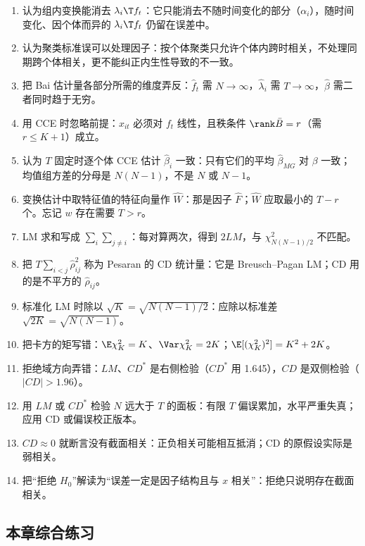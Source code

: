 \begin{enumerate}
  \item 认为组内变换能消去 $\lambda_i\T f_t$：它只能消去不随时间变化的部分（$\alpha_i$），随时间变化、因个体而异的 $\lambda_i\T f_t$ 仍留在误差中。
  \item 认为聚类标准误可以处理因子：按个体聚类只允许个体内跨时相关，不处理同期跨个体相关，更不能纠正内生性导致的不一致。
  \item 把 Bai 估计量各部分所需的维度弄反：$\hat f_t$ 需 $N\to\infty$，$\hat\lambda_i$ 需 $T\to\infty$，$\hat\beta$ 需二者同时趋于无穷。
  \item 用 CCE 时忽略前提：$x_{it}$ 必须对 $f_t$ 线性，且秩条件 $\rank\bar B=r$（需 $r\le K+1$）成立。
  \item 认为 $T$ 固定时逐个体 CCE 估计 $\hat\beta_i$ 一致：只有它们的平均 $\hat\beta_{MG}$ 对 $\beta$ 一致；均值组方差的分母是 $N(N-1)$，不是 $N$ 或 $N-1$。
  \item 变换估计中取特征值的特征向量作 $\hat W$：那是因子 $\hat F$；$\hat W$ 应取最小的 $T-r$ 个。忘记 $w$ 存在需要 $T>r$。
  \item LM 求和写成 $\sum_i\sum_{j\neq i}$：每对算两次，得到 $2LM$，与 $\chi^2_{N(N-1)/2}$ 不匹配。
  \item 把 $T\sum_{i<j}\hat\rho_{ij}^2$ 称为 Pesaran 的 CD 统计量：它是 Breusch--Pagan LM；CD 用的是不平方的 $\hat\rho_{ij}$。
  \item 标准化 LM 时除以 $\sqrt K=\sqrt{N(N-1)/2}$：应除以标准差 $\sqrt{2K}=\sqrt{N(N-1)}$。
  \item 把卡方的矩写错：$\E\chi^2_K=K$、$\Var\chi^2_K=2K$；$\E[(\chi^2_K)^2]=K^2+2K$。
  \item 拒绝域方向弄错：$LM$、$CD^*$ 是右侧检验（$CD^*$ 用 1.645），$CD$ 是双侧检验（$|CD|>1.96$）。
  \item 用 $LM$ 或 $CD^*$ 检验 $N$ 远大于 $T$ 的面板：有限 $T$ 偏误累加，水平严重失真；应用 CD 或偏误校正版本。
  \item $CD\approx0$ 就断言没有截面相关：正负相关可能相互抵消；CD 的原假设实际是弱相关。
  \item 把“拒绝 $H_0$”解读为“误差一定是因子结构且与 $x$ 相关”：拒绝只说明存在截面相关。
\end{enumerate}

\subsection{本章综合练习}

